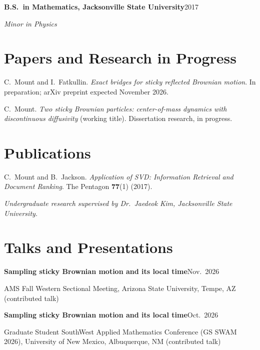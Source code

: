 \documentclass[11pt,letterpaper]{article}
\newcommand{\entry}[2]{\Needspace{4\baselineskip}\noindent\textbf{#1}\hfill #2\par}
\newcommand{\subentry}[1]{\noindent\textit{#1}\par}
\begin{document}
\medskip
\entry{B.S.\ in Mathematics, Jacksonville State University}{2017}
\subentry{Minor in Physics}

\section{Papers and Research in Progress}
\begin{enumerate}[label={[\arabic*]}, leftmargin=2.2em, itemsep=0.8ex]
  \item C.~Mount and I.~Fatkullin.
        \emph{Exact bridges for sticky reflected Brownian motion}.
        In preparation; arXiv preprint expected November 2026.
  \item C.~Mount.
        \emph{Two sticky Brownian particles: center-of-mass dynamics with
        discontinuous diffusivity} (working title).
        Dissertation research, in progress.
\end{enumerate}

\section{Publications}
\begin{enumerate}[label={[\arabic*]}, leftmargin=2.2em, itemsep=0.8ex]
  \item C.~Mount and B.~Jackson.
        \emph{Application of SVD: Information Retrieval and Document Ranking}.
        The Pentagon \textbf{77}(1) (2017).
        \par \textit{Undergraduate research supervised by Dr.\ Jaedeok Kim,
        Jacksonville State University.}
\end{enumerate}

\section{Talks and Presentations}
\entry{Sampling sticky Brownian motion and its local time}{Nov.\ 2026}
AMS Fall Western Sectional Meeting, Arizona State University, Tempe, AZ
(contributed talk)

\medskip
\entry{Sampling sticky Brownian motion and its local time}{Oct.\ 2026}
Graduate Student SouthWest Applied Mathematics Conference (GS SWAM 2026),
University of New Mexico, Albuquerque, NM (contributed talk)
\end{document}
